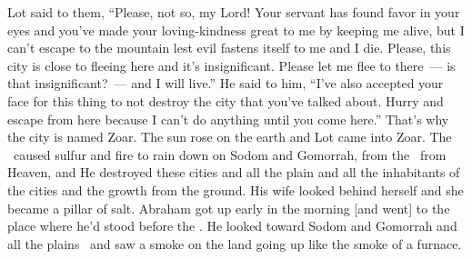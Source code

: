 \begin{inparaenum}
   Lot said to them, ``Please, not so, my Lord!%
   Your servant has found favor in your eyes and you've made your loving-kindness great to me by keeping me alive, but I can't escape to the mountain lest evil fastens itself to me and I die.%
   Please, this city is close to fleeing here and it's insignificant. Please let me flee to there~--- is that insignificant?~--- and I will live.''%
   He said to him, ``I've also accepted your face for this thing to not destroy the city that you've talked about.%
   Hurry and escape from here because I can't do anything until you come here.'' That's why the city is named Zoar.%
   The sun rose on the earth and Lot came into Zoar.%
   The \lord\ caused sulfur and fire to rain down on Sodom and Gomorrah, from the \lord\ from Heaven,%
   and He destroyed these cities and all the plain and all the inhabitants of the cities and the growth from the ground.%
   His wife looked behind herself and she became a pillar of salt.%
   Abraham got up early in the morning [and went] to the place where he'd stood before the \lord.%
   He looked toward Sodom and Gomorrah and all the plains\
  and saw a smoke on the land going up like the smoke of a furnace.\alt{forge.}%
  

\end{inparaenum}
